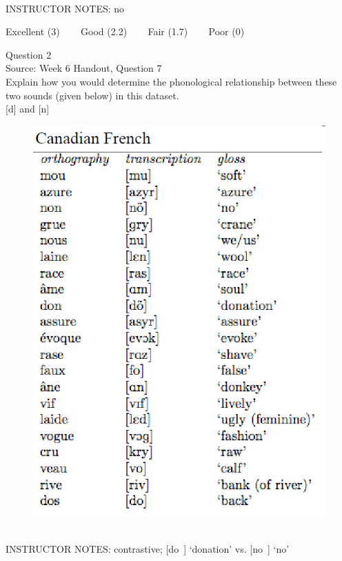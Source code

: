 \documentclass[12pt]{article}
\begin{document}
~\\
INSTRUCTOR NOTES: no


\vfill
Excellent (3) ~~~ Good (2.2) ~~~ Fair (1.7) ~~~ Poor (0)
\newpage

{\large Question 2}\\

Source: Week 6 Handout, Question 7\\

Explain how you would determine the phonological relationship between these two sounds (given below) in this dataset.\\

{[d]} and {[n]}

\begin{figure}[H]
\includegraphics{../images/canadianfrench.png}
\end{figure}

~\\
INSTRUCTOR NOTES: contrastive; [do~] ‘donation’ vs. [no~] ‘no’
\end{document}

